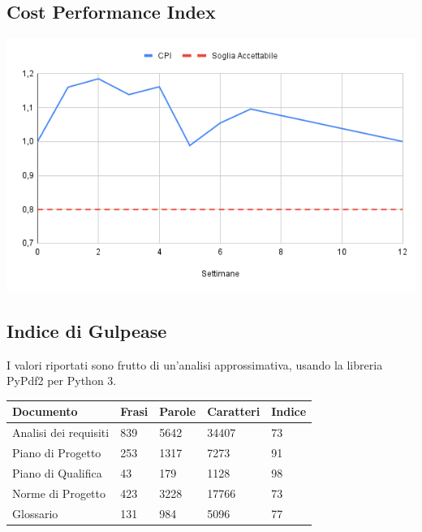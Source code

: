 \documentclass[a4paper, 12pt]{article}
\begin{document}
\subsection{Cost Performance Index}
\begin{center}
	\includegraphics[scale=0.6]{CPI.png}
\end{center}

\subsection{Indice di Gulpease}
I valori riportati sono frutto di un'analisi approssimativa, usando la libreria PyPdf2 per Python 3.
\begin{center}
	\begin{tabularx}{\textwidth}{|X|X|X|X|X|}
		\hline
		\textbf{Documento} & \textbf{Frasi } & \textbf{Parole } & \textbf{Caratteri } & \textbf{Indice }\\
		\hline
		Analisi dei requisiti &  839                   & 5642 & 34407 & 73                       \\
		\hline
		Piano di Progetto    & 253                     & 1317       & 7273 & 91             \\
		\hline
		Piano di Qualifica    & 43                     & 179       & 1128 &   98             \\
		\hline
		Norme di Progetto    & 423                     & 3228       & 17766 &  73              \\
		\hline
		Glossario    & 131                     		& 984 		& 5096 &    77            \\
		\hline
	\end{tabularx}\\[8pt]
	\mbox{}\\
\end{center}
\end{document}
